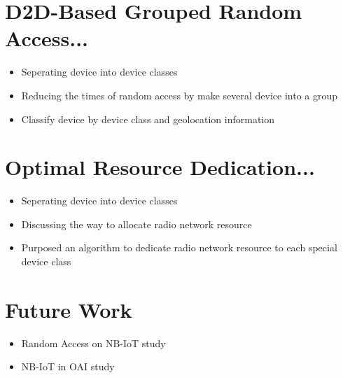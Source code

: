 \documentclass[journal]{IEEEtran}
\begin{document}
\section{D2D-Based Grouped Random Access... ~\cite{HanHSDS17}}
\begin{itemize}
    \item {Seperating device into device classes} 
    \item {Reducing the times of random access by make several device into a group}
    \item {Classify device by device class and geolocation information}
\end{itemize}
\section{Optimal Resource Dedication... ~\cite{HanHS17}}
\begin{itemize}
    \item {Seperating device into device classes} 
    \item {Discussing the way to allocate radio network resource}
    \item {Purposed an algorithm to dedicate radio network resource to each special device class}
\end{itemize}
\section{Future Work}
\begin{itemize}
	\item {Random Access on NB-IoT study }
	\item {NB-IoT in OAI study ~\cite{OAI}}
\end{itemize}
% 
% 
% 


{\footnotesize
}


\end{document}
